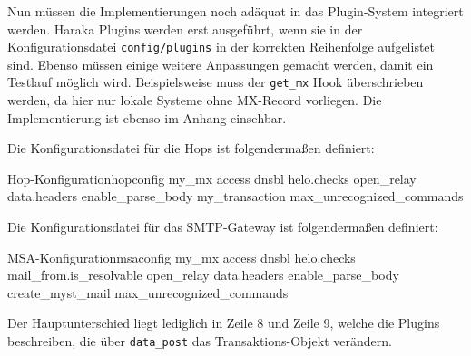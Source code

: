 Nun müssen die Implementierungen noch adäquat in das Plugin-System integriert werden. Haraka Plugins werden erst ausgeführt, wenn sie in der Konfigurationsdatei \verb#config/plugins# in der korrekten Reihenfolge aufgelistet sind. Ebenso müssen einige weitere Anpassungen gemacht werden, damit ein Testlauf möglich wird. Beispielsweise muss der \verb#get_mx# Hook überschrieben werden, da hier nur lokale Systeme ohne MX-Record vorliegen. Die Implementierung ist ebenso im Anhang einsehbar. %

Die Konfigurationsdatei für die Hops ist folgendermaßen definiert:
\begin{mail}{Hop-Konfiguration}{hopconfig}
my_mx
access
dnsbl
helo.checks
open_relay
data.headers
enable_parse_body
my_transaction
max_unrecognized_commands   
\end{mail}

Die Konfigurationsdatei für das SMTP-Gateway ist folgendermaßen definiert:
\begin{mail}{MSA-Konfiguration}{msaconfig}
my_mx
access
dnsbl
helo.checks
mail_from.is_resolvable
open_relay
data.headers
enable_parse_body
create_myst_mail
max_unrecognized_commands    
\end{mail}

Der Hauptunterschied liegt lediglich in Zeile 8 und Zeile 9, welche die Plugins beschreiben, die über \verb#data_post# das Transaktions-Objekt verändern.

